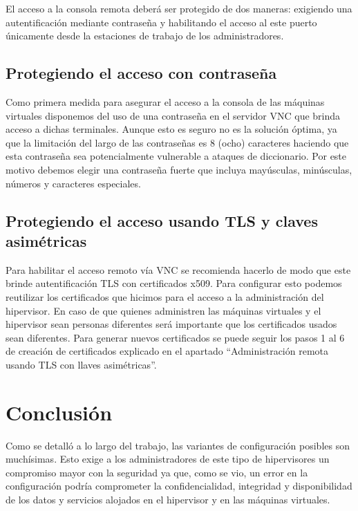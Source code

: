 	El acceso a la consola remota deberá ser protegido de dos maneras:
exigiendo una autentificación mediante contraseña y habilitando el acceso al
	este puerto únicamente desde la estaciones de trabajo de los
administradores.
	
	\section{Protegiendo el acceso con contraseña}
	Como primera medida para asegurar el acceso a la consola de las
máquinas virtuales disponemos del uso de una contraseña en el servidor
	VNC que brinda acceso a dichas terminales. Aunque esto es seguro no es la
solución óptima, ya que la limitación del largo de las contraseñas es 8 (ocho)
caracteres haciendo que esta contraseña sea potencialmente vulnerable a ataques de diccionario. \cite{4} Por este motivo debemos elegir una contraseña
fuerte que incluya mayúsculas, minúsculas, números y caracteres
especiales. 
	
	\section{Protegiendo el acceso usando TLS y claves asimétricas}
	Para habilitar el acceso remoto vía VNC se recomienda hacerlo de
modo que este brinde autentificación TLS con certificados x509. Para
	configurar esto podemos reutilizar los certificados que hicimos para el
acceso a la administración del hipervisor. En caso de que quienes
	administren las máquinas virtuales y el hipervisor sean personas diferentes
será importante que los certificados usados sean diferentes. Para generar
nuevos certificados se puede seguir los pasos 1 al 6 de creación de	certificados explicado en el apartado “Administración remota usando TLS
con llaves asimétricas”.
	
	\chapter{Conclusión}
	
	Como se detalló a lo largo del trabajo, las variantes de configuración
	posibles son muchísimas. Esto exige a los administradores de este tipo de
	hipervisores un compromiso mayor con la seguridad ya que, como se vio, un
	error en la configuración podría comprometer la confidencialidad, integridad
	y disponibilidad de los datos y servicios alojados en el hipervisor y en las
	máquinas virtuales. \newline
	
